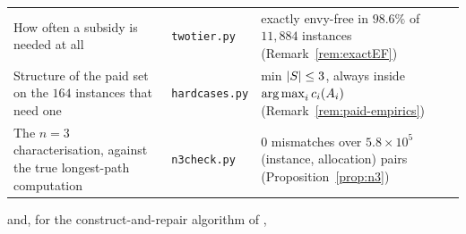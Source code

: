 \begin{center}
\begin{tabular}{@{}p{}p{}p{}@{}}
How often a subsidy is needed at all
  & \texttt{twotier.py} & exactly envy-free in $98.6\%$ of $11{,}884$ instances
    (Remark~\ref{rem:exactEF}) \\
Structure of the paid set on the $164$ instances that need one
  & \texttt{hardcases.py} & min $\left\lvert S\right\rvert \le 3$, always inside
    $\operatorname*{arg\,max}_i c_i(A_{i})$ (Remark~\ref{rem:paid-empirics}) \\
The $n = 3$ characterisation, against the true longest-path computation
  & \texttt{n3check.py} & $0$ mismatches over $5.8 \times 10^{5}$
    (instance, allocation) pairs (Proposition~\ref{prop:n3}) \\
\bottomrule
\end{tabular}
\end{center}

\noindent
and, for the construct-and-repair algorithm of ,

